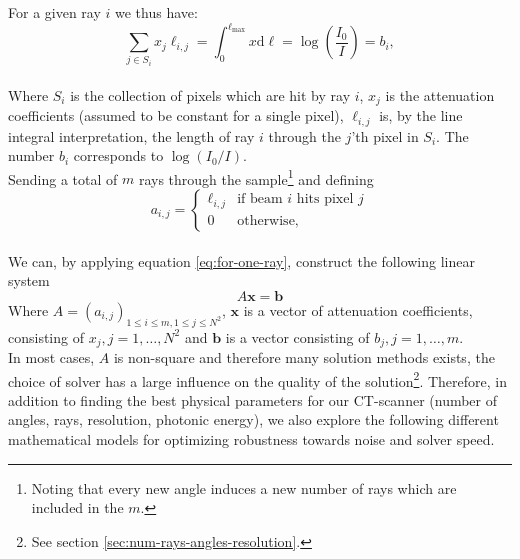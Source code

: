 \documentclass{article}
\begin{document}
For a given ray $i$ we thus have: \\
\begin{equation}\label{eq:for-one-ray}
    \sum_{j \in S_i} x_j \ell_{i, j} = \int_{0}^{\ell_{\max}}x \text{d} \ell = \log\left(\frac{I_0}{I}\right) = b_i,
\end{equation} \\
Where $S_i$ is the collection of pixels which are hit by ray $i$, $x_j$ is the attenuation coefficients (assumed to be constant for a single pixel), $\ell_{i, j}$ is, by the line integral interpretation, the length of ray $i$ through the $j$'th pixel in $S_i$. The number $b_i$ corresponds to $\log{(I_0 / I)}$. \\
Sending a total of $m$ rays through the sample\footnote{Noting that every new angle induces a new number of rays which are included in the $m$.}  and defining \\
\begin{equation}
    a_{i, j} = 
    \begin{cases}
        \ell_{i, j} & \text{if beam $i$ hits pixel $j$} \\
        0 & \text{otherwise,}
    \end{cases}
\end{equation} \\
We can, by applying equation \ref{eq:for-one-ray}, construct the following linear system
\begin{equation}
    A \boldsymbol{x} = \boldsymbol{b} \label{eq:main}
\end{equation} 
\noindent Where $A = (a_{i,j})_{1 \leq i \leq m, 1 \leq j \leq N^2}$, $\boldsymbol{x}$ is a vector of attenuation coefficients, consisting of $x_j, j = 1, \dots, N^2$ and $\boldsymbol{b}$ is a vector consisting of $b_j, j = 1, \dots, m$. \\
In most cases, $A$ is non-square and therefore many solution methods exists, the choice of solver has a large influence on the quality of the solution\footnote{See section \ref{sec:num-rays-angles-resolution}.}. Therefore, in addition to finding the best physical parameters for our CT-scanner (number of angles, rays, resolution, photonic energy), we also explore the following different mathematical models for optimizing robustness towards noise and solver speed.
\end{document}
